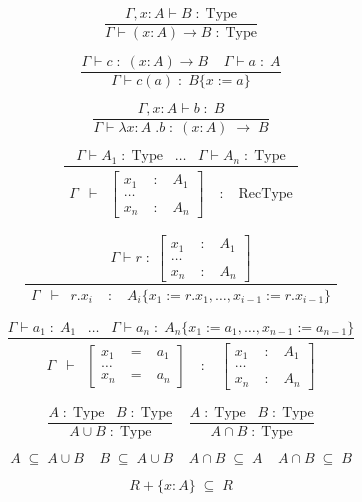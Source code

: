 

\[
\frac{
  \Gamma, x : A \vdash  B \;:\; \mbox{Type}
}{
  \Gamma \vdash  ( x:A )\rightarrow B \;:\; \mbox{Type}
}
\]

\[
\frac{
  \Gamma \vdash  c \;:\; ( x:A )\rightarrow B \;\;\;\;  \Gamma \vdash a \;:\; A
}{
  \Gamma \vdash  c(a) \;:\; B \{ x := a \}
}
\]

\[
\frac{
  \Gamma, x : A \vdash   b \;:\; B
}{
  \Gamma \vdash  \lambda x:A\;.b\;:\;(x:A)\;\rightarrow\;B
}
\]

\[
\frac{
    \Gamma \vdash A_{1} \;:\; \mbox{Type}  
     \;\;\;  \ldots \;\;\; 
    \Gamma \vdash A_{n} \;:\; \mbox{Type}
}{
  \begin{array}{lclcl}
  \Gamma & \vdash &\left[\begin{array}{lcl}x_{1} & \;:\; & A_{1} \\ \ldots & \\ x_{n} & \;:\; &  A_{n}\end{array}\right] 
    & \;:\; & \mbox{RecType}
  \end{array}
}
\]

\[
\frac{
  \Gamma \vdash r \;:\; \left[\begin{array}{lcl}x_{1} & \;:\; & A_{1} \\ \ldots & \\ x_{n} & \;:\; &  A_{n}\end{array}\right]
}{
\begin{array}{lclcl}
  \Gamma & \vdash & r.x_{i} & \;:\; & A_{i} \{ x_{1} := r.x_{1} , \ldots , x_{i-1} := r.x_{i-1} \}
  \end{array}
}
\]

\[
\frac{
    \Gamma \vdash a_{1} \;:\;  A_{1} 
         \;\;\;  \ldots \;\;\; 
    \Gamma \vdash a_{n} \;:\; A_{n} \{   x_{1} := a_{1} , \ldots , x_{n-1} := a_{n-1}  \}
}{
  \begin{array}{lclcl}
  \Gamma & \vdash &\left[\begin{array}{lcl}x_{1} & \;=\; & a_{1} \\ \ldots & \\ x_{n} & \;=\; &  a_{n}\end{array}\right] 
    & \;:\; & \left[\begin{array}{lcl}x_{1} & \;:\; & A_{1} \\ \ldots & \\ x_{n} & \;:\; & A_{n}\end{array}\right]
  \end{array}
}
\]

\[
\frac{
A \;:\; \mbox{Type} \;\;\;  B \;:\; \mbox{Type} 
}{
A\cup B \;:\; \mbox{Type} 
}
\;\;\;\;
\frac{
A \;:\; \mbox{Type} \;\;\;  B \;:\; \mbox{Type} 
}{
A\cap B \;:\; \mbox{Type} 
}
\]




\[
A \;\subseteq\; A\cup B
\;\;\;\; 
B \;\subseteq\; A\cup B
\;\;\;\; 
A\cap B\;\subseteq\;A
\;\;\;\; 
A\cap B\;\subseteq\;B
\]

\[
R + \{ x : A \} \;\subseteq\; R
\]




